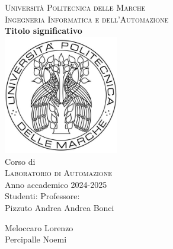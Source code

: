\documentclass[11pt]{report}
\begin{document}


\begin{titlepage}
\begin{center}
\LARGE {\scshape{Università Politecnica delle Marche}}\\[0.5cm]
\LARGE {\scshape{Ingegneria Informatica e dell'Automazione}}\\[0.7cm]
\linespread{1}
\huge {\bfseries Titolo significativo }\\[1cm]
\linespread{1}
\includegraphics[width=5cm]{images/logoUnivpm.jpg}\\[0.5cm]
\linespread{1.2}
\Large Corso di\\
\Large {\scshape{Laboratorio di Automazione}} \\[0.3cm]
\Large {Anno accademico 2024-2025 \\[0.8cm]}
{\Large Studenti:}
\hfill {\Large Professore:}\\
{\Large Pizzuto Andrea}
\hfill
{\Large Andrea Bonci}

\raggedright{\Large Meloccaro Lorenzo\\
\Large Percipalle Noemi\\} 



\end{center}
\end{titlepage}
\end{document}
